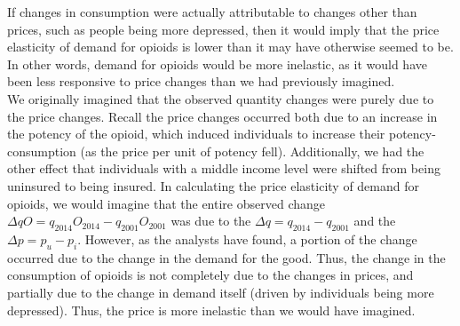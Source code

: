 \documentclass{article}
\begin{document}
 \par
If changes in consumption were actually attributable to changes other than prices, such as people being more depressed, then it would imply that the price elasticity of demand for opioids is lower than it may have otherwise seemed to be. In other words, demand for opioids would be more inelastic, as it would have been less responsive to price changes than we had previously imagined.\\

We originally imagined that the observed quantity changes were purely due to the price changes. Recall the price changes occurred both due to an increase in the potency of the opioid, which induced individuals to increase their potency-consumption (as the price per unit of potency fell). Additionally, we had the other effect that individuals with a middle income level were shifted from being uninsured to being insured. In calculating the price elasticity of demand for opioids, we would imagine that the entire observed change $\Delta qO = q_{2014}O_{2014} - q_{2001}O_{2001}$ was due to the $\Delta q = q_{2014} - q_{2001}$ and the $\Delta p = p_u - p_i$. However, as the analysts have found, a portion of the change occurred due to the change in the demand for the good. Thus, the change in the consumption of opioids is not completely due to the changes in prices, and partially due to the change in demand itself (driven by individuals being more depressed). Thus, the price is more inelastic than we would have imagined.
\end{document}
